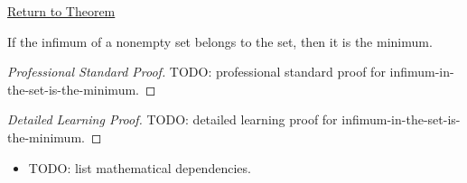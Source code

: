 \newpage
{}
\label{prf:infimum-in-the-set-is-the-minimum}

\begin{remark*}[Return]
\hyperref[prop:infimum-in-the-set-is-the-minimum]{Return to Theorem}
\end{remark*}

\begin{proposition*}
If the infimum of a nonempty set belongs to the set, then it is the minimum.
\end{proposition*}

\begin{proof}[Professional Standard Proof]
\LRAProofBodyStart
TODO: professional standard proof for infimum-in-the-set-is-the-minimum.
\end{proof}

\begin{proof}[Detailed Learning Proof]
\LRAProofBodyStart
TODO: detailed learning proof for infimum-in-the-set-is-the-minimum.
\end{proof}

\begin{remark*}
\end{remark*}

\begin{dependencies}
\begin{itemize}
  \item TODO: list mathematical dependencies.
\end{itemize}
\end{dependencies}

\clearpage
